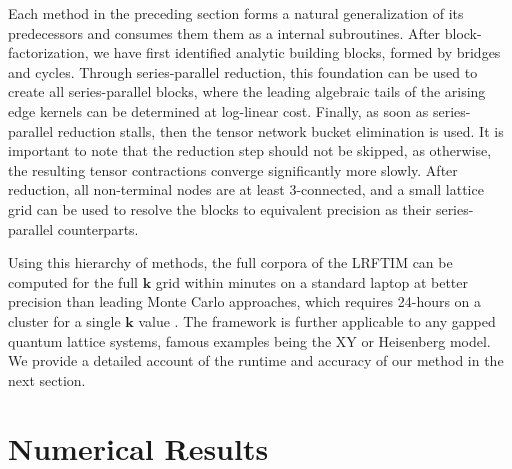 \documentclass[]{amsart}
\numberwithin{mythm}{section}
\begin{document}
Each method in the preceding section forms a natural generalization of its predecessors and consumes them them as a internal subroutines. After block-factorization, we have first identified analytic building blocks, formed by bridges and cycles. Through series-parallel reduction, this foundation can be used to create all series-parallel blocks, where the leading algebraic tails of the arising edge kernels can be determined at log-linear cost. Finally, as soon as series-parallel reduction stalls, then the tensor network bucket elimination is used. It is important to note that the reduction step should not be skipped, as otherwise, the resulting tensor contractions converge significantly more slowly. After reduction, all non-terminal nodes are at least 3-connected, and a small lattice grid can be used to resolve the blocks to equivalent precision as their series-parallel counterparts.

Using this hierarchy of methods, the full corpora of the LRFTIM can be computed for the full $\bm k$ grid within minutes on a standard laptop at better precision than leading Monte Carlo approaches, which requires 24-hours on a cluster for a single $\bm k$ value \cite{adelhardt2024monte}. The framework is further applicable to any gapped quantum lattice systems, famous examples being the XY or Heisenberg model. We provide a detailed account of the runtime and accuracy of our method in the next section. 

\section{Numerical Results}
\label{sec:benchmarks}
\end{document}
